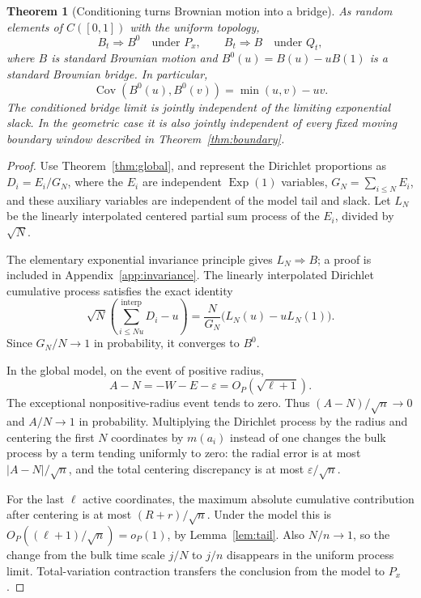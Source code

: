 \documentclass[11pt,letterpaper]{article}
\numberwithin{equation}{section}
\newtheorem{theorem}{Theorem}[section]
\theoremstyle{definition}
\theoremstyle{remark}
\newcommand{\Exp}{\operatorname{Exp}}
\newcommand{\Cov}{\operatorname{Cov}}
\newcommand{\eps}{\varepsilon}
\begin{document}
\begin{theorem}[Conditioning turns Brownian motion into a bridge]
\label{thm:bridge}
As random elements of $C([0,1])$ with the uniform topology,
\begin{equation}
 B_t\Rightarrow B^0\quad\text{under }P_x,
 \qquad
 B_t\Rightarrow B\quad\text{under }Q_t,
 \label{eq:bridge}
\end{equation}
where $B$ is standard Brownian motion and
$B^0(u)=B(u)-uB(1)$ is a standard Brownian bridge. In particular,
\[
 \Cov(B^0(u),B^0(v))=\min(u,v)-uv.
\]
The conditioned bridge limit is jointly independent of the limiting
exponential slack. In the geometric case it is also jointly independent of
every fixed moving boundary window described in
Theorem~\ref{thm:boundary}.
\end{theorem}
\begin{proof}
Use Theorem~\ref{thm:global}, and represent the Dirichlet proportions as
$D_i=E_i/G_N$, where the $E_i$ are independent $\Exp(1)$ variables,
$G_N=\sum_{i\le N}E_i$, and these auxiliary variables are independent of the
model tail and slack. Let $L_N$ be the linearly interpolated centered partial
sum process of the $E_i$, divided by $\sqrt N$.

The elementary exponential invariance principle gives $L_N\Rightarrow B$;
a proof is included in Appendix~\ref{app:invariance}. The linearly interpolated
Dirichlet cumulative process satisfies the exact identity
\begin{equation}
 \sqrt N\left(\sum_{i\le Nu}^{\mathrm{interp}}D_i-u\right)
 =\frac{N}{G_N}\big(L_N(u)-uL_N(1)\big).
 \label{eq:dirbridge}
\end{equation}
Since $G_N/N\to1$ in probability, it converges to $B^0$.

In the global model, on the event of positive radius,
\[
 A-N=-W-E-\eps=O_P(\sqrt{\ell+1}).
\]
The exceptional nonpositive-radius event tends to zero. Thus
$(A-N)/\sqrt n\to0$ and $A/N\to1$ in probability. Multiplying the Dirichlet
process by the radius and centering the first $N$ coordinates by $m(a_i)$
instead of one changes the bulk process by a term tending uniformly to zero:
the radial error is at most $|A-N|/\sqrt n$, and the total centering discrepancy
is at most $\eps/\sqrt n$.

For the last $\ell$ active coordinates, the maximum absolute cumulative
contribution after centering is at most $(R+r)/\sqrt n$. Under the model this
is $O_P((\ell+1)/\sqrt n)=o_P(1)$, by Lemma~\ref{lem:tail}. Also $N/n\to1$,
so the change from the bulk time scale $j/N$ to $j/n$ disappears in the uniform
process limit. Total-variation contraction transfers the conclusion from the
model to $P_x$.


\end{proof}
\end{document}
